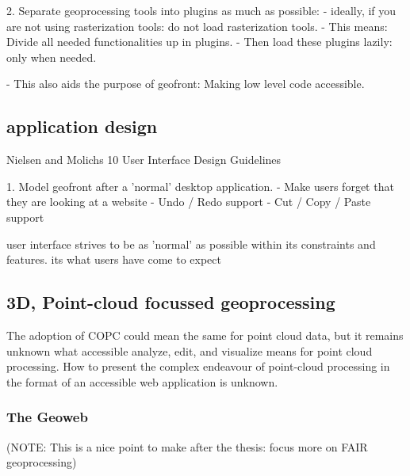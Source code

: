 2. Separate geoprocessing tools into plugins as much as possible: 
  - ideally, if you are not using rasterization tools: do not load rasterization tools. 
  - This means: Divide all needed functionalities up in plugins.
     - Then load these plugins lazily: only when needed.

  - This also aids the purpose of geofront: Making low level code accessible.

\subsection{application design}

Nielsen and Molichs 10 User Interface Design Guidelines

1. Model geofront after a 'normal' desktop application.  
  - Make users forget that they are looking at a website
  - Undo / Redo support
  - Cut / Copy / Paste support

  user interface strives to be as 'normal' as possible within its constraints and features. its what users have come to expect



\subsection{3D, Point-cloud focussed geoprocessing}

The adoption of COPC could mean the same for point cloud data, but it remains unknown what accessible analyze, edit, and visualize means for point cloud processing. 
How to present the complex endeavour of point-cloud processing in the format of an accessible web application is unknown. 




\subsubsection*{The Geoweb}
\label{sec:geoweb}

(NOTE: This is a nice point to make after the thesis: focus more on FAIR geoprocessing)

